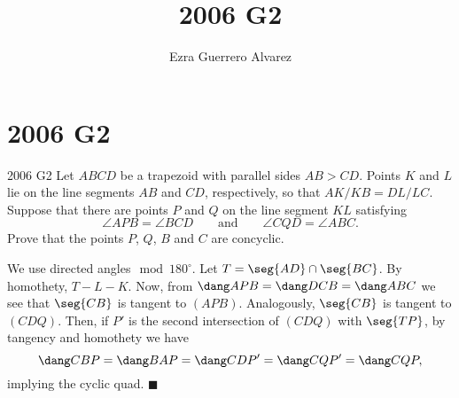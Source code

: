 \documentclass[14pt]{article}
\title{2006 G2}
\author{Ezra Guerrero Alvarez}
\begin{document}
\maketitle
	
\section*{2006 G2}

\begin{statement}{2006 G2}
	Let $ ABCD$ be a trapezoid with parallel sides $ AB > CD$. Points $ K$ and $ L$ lie on the line segments $ AB$ and $ CD$, respectively, so that $AK/KB=DL/LC$. Suppose that there are points $ P$ and $ Q$ on the line segment $ KL$ satisfying
	\[ \angle{APB} = \angle{BCD}\qquad\text{and}\qquad \angle{CQD} = \angle{ABC}. \]
	Prove that the points $ P$, $ Q$, $ B$ and $ C$ are concyclic.
\end{statement}
We use directed angles$\mod180^\circ$. Let $T=\seg{AD}\cap\seg{BC}$. By homothety, $T-L-K$. Now, from $\dang APB = \dang DCB = \dang ABC$ we see that $\seg{CB}$ is tangent to $(APB)$. Analogously, $\seg{CB}$ is tangent to $(CDQ)$. Then, if $P'$ is the second intersection of $(CDQ)$ with $\seg{TP}$, by tangency and homothety we have
\[ \dang CBP = \dang BAP = \dang CDP' = \dang CQP' = \dang CQP, \]
implying the cyclic quad. $\blacksquare$
	
\end{document}
